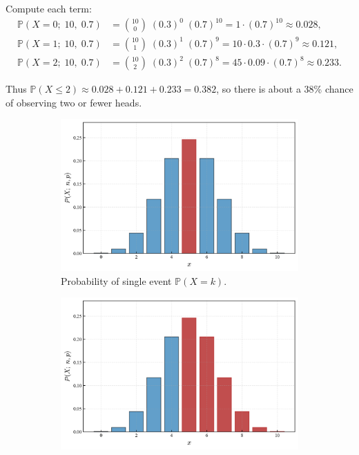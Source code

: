 \documentclass{book}
\begin{document}
Compute each term:
\begin{align}
	\mathbb{P}(X = 0; \; 10, \; 0.7) &= \binom{10}{0} \; (0.3)^0 \; (0.7)^10 = 1 \cdot (0.7)^{10} \approx 0.028, \nonumber \\
	\mathbb{P}(X = 1; \; 10, \; 0.7) &= \binom{10}{1} \; (0.3)^1 \; (0.7)^9 = 10 \cdot 0.3 \cdot (0.7)^9 \approx 0.121, \nonumber \\
	\mathbb{P}(X = 2; \; 10, \; 0.7) &= \binom{10}{2} \; (0.3)^2 \; (0.7)^8 = 45 \cdot 0.09 \cdot (0.7)^8 \approx 0.233. \nonumber
\end{align}

Thus $\mathbb{P}(X \leq 2) \approx 0.028 + 0.121 + 0.233 = 0.382$, so there is about a 38\% chance of observing two or fewer heads.

\begin{figure}[ht]
    \centering
    \begin{subfigure}[b]{0.48\textwidth}
        \centering
        \includegraphics[width=\textwidth, height=0.7\textwidth]{figures/chapter2/binomial_1.png}
        \caption{Probability of single event $\mathbb{P} (X = k)$.}
        \label{fig:binomial1}
    \end{subfigure}
    \hfill
    \begin{subfigure}[b]{0.48\textwidth}
        \centering
        \includegraphics[width=\textwidth, height=0.7\textwidth]{figures/chapter2/binomial_1_cum.png}

\end{subfigure}
\end{figure}
\end{document}

